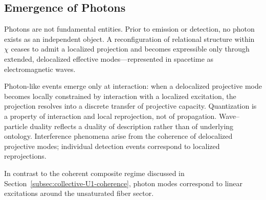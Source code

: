 \subsection{Emergence of Photons}
  \label{subsec:emergence-of-photons}

  Photons are not fundamental entities.
  Prior to emission or detection, no photon exists as an independent object.
  A reconfiguration of relational structure within~$\chi$ ceases to admit
  a localized projection and becomes expressible only through extended,
  delocalized effective modes---represented in spacetime as electromagnetic waves.

  Photon-like events emerge only at interaction: when a delocalized
  projective mode becomes locally constrained by interaction with a
  localized excitation, the projection resolves into a discrete transfer of projective capacity.
  Quantization is a property of interaction and local reprojection, not of propagation.
  Wave--particle duality reflects a duality of description rather than of underlying ontology.
  Interference phenomena arise from the coherence of delocalized projective
  modes; individual detection events correspond to localized reprojections.

  In contrast to the coherent composite regime discussed in
  Section~\ref{subsec:collective-U1-coherence}, photon modes correspond to
  linear excitations around the unsaturated fiber sector.
